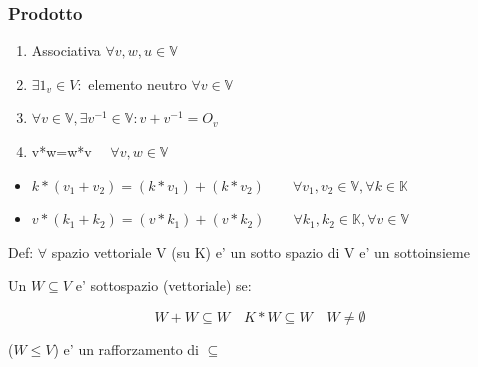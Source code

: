 \documentclass{article}
\begin{document}
\subsubsection*{Prodotto}
\begin{enumerate}
	\item Associativa $\forall v,w,u \in \mathbb{V}$
	\item $\exists 1_v \in V: $ elemento neutro $\forall v \in \mathbb{V}$
	\item $\forall v \in  \mathbb{V},\exists v^{-1} \in \mathbb{V}:v+v^{-1}=O_v$
	\item v*w=w*v $\quad \forall v,w \in \mathbb{V}$
\end{enumerate}
\begin{itemize}
	\item $k*(v_1+v_2)=(k*v_1)+(k*v_2) \quad \quad \forall v_1,v_2 \in \mathbb{V}, \forall k \in \mathbb{K}$
	\item $v*(k_1+k_2)=(v*k_1)+(v*k_2) \quad \quad \forall k_1,k_2 \in \mathbb{K}, \forall v \in \mathbb{V}$
\end{itemize}
\begin{flushleft}
	Def: $\forall$ spazio vettoriale V (su K) e' un sotto spazio di V e' un sottoinsieme
\end{flushleft}
\begin{flushleft}
	Un $W \subseteq V$ e' sottospazio (vettoriale) se:
\end{flushleft}
\begin{equation*}
	W+W \subseteq W \quad K*W \subseteq W \quad W \neq \emptyset
\end{equation*}
\begin{flushleft}
	($W\leq V$) e' un rafforzamento di $\subseteq$
\end{flushleft}
\end{document}

